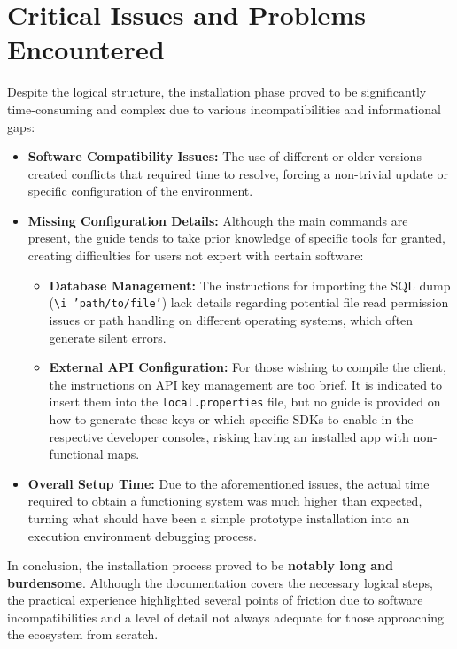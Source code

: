 \section{Critical Issues and Problems Encountered}

Despite the logical structure, the installation phase proved to be significantly time-consuming and complex due to various incompatibilities and informational gaps:

\begin{itemize}
    \item \textbf{Software Compatibility Issues:} The use of different or older versions created conflicts that required time to resolve, forcing a non-trivial update or specific configuration of the environment.
    \item \textbf{Missing Configuration Details:} Although the main commands are present, the guide tends to take prior knowledge of specific tools for granted, creating difficulties for users not expert with certain software:
    \begin{itemize}
        \item \textbf{Database Management:} The instructions for importing the SQL dump (\texttt{\textbackslash i 'path/to/file'}) lack details regarding potential file read permission issues or path handling on different operating systems, which often generate silent errors.
        \item \textbf{External API Configuration:} For those wishing to compile the client, the instructions on API key management are too brief. It is indicated to insert them into the \texttt{local.properties} file, but no guide is provided on how to generate these keys or which specific SDKs to enable in the respective developer consoles, risking having an installed app with non-functional maps.
    \end{itemize}
    \item \textbf{Overall Setup Time:} Due to the aforementioned issues, the actual time required to obtain a functioning system was much higher than expected, turning what should have been a simple prototype installation into an execution environment debugging process.
\end{itemize}

In conclusion, the installation process proved to be \textbf{notably long and burdensome}. Although the documentation covers the necessary logical steps, the practical experience highlighted several points of friction due to software incompatibilities and a level of detail not always adequate for those approaching the ecosystem from scratch.